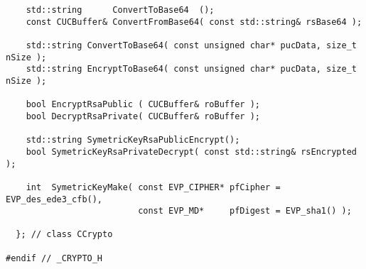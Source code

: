 \documentclass[twoside,a4paper,english,12pt,authoryear,openright]{book}
\begin{document}
\begin{lstlisting}
    std::string      ConvertToBase64  ();
    const CUCBuffer& ConvertFromBase64( const std::string& rsBase64 );

    std::string ConvertToBase64( const unsigned char* pucData, size_t nSize );
    std::string EncryptToBase64( const unsigned char* pucData, size_t nSize );

    bool EncryptRsaPublic ( CUCBuffer& roBuffer );
    bool DecryptRsaPrivate( CUCBuffer& roBuffer );

    std::string SymetricKeyRsaPublicEncrypt();
    bool SymetricKeyRsaPrivateDecrypt( const std::string& rsEncrypted );

    int  SymetricKeyMake( const EVP_CIPHER* pfCipher = EVP_des_ede3_cfb(),
                          const EVP_MD*     pfDigest = EVP_sha1() );

  }; // class CCrypto

#endif // _CRYPTO_H
\end{lstlisting}

























\backmatter 
 

% 

\end{document}
